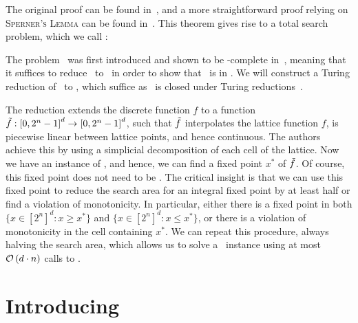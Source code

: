 The original proof can be found in~, and a more straightforward proof relying on \textsc{Sperner's Lemma} can be found in~. This theorem gives rise to a total search problem, which we call \Brouwer:


The problem \Brouwer\ was first introduced and shown to be \PPAD-complete in~, meaning that it suffices to reduce \Tarski\ to \Brouwer\ in order to show that \Tarski\ is in \PPAD\@. We will construct a Turing reduction of \Tarski\ to \Brouwer, which suffice as \PPAD\ is closed under Turing reductions~.

The reduction extends the discrete function $f$ to a function $\Tilde{f} : {[0, 2^n - 1]}^d \rightarrow {[0, 2^n - 1]}^d$, such that $\Tilde{f}$ interpolates the lattice function $f$, is piecewise linear between lattice points, and hence continuous. The authors achieve this by using a simplicial decomposition of each cell of the lattice. Now we have an instance of \Brouwer, and hence, we can find a fixed point $x^*$ of $\Tilde{f}$. Of course, this fixed point does not need to be .
The critical insight is that we can use this fixed point to reduce the search area for an integral fixed point by at least half or find a violation of monotonicity. In particular, either there is a fixed point in both $\{x \in {[2^n]}^d : x \geq x^*\}$ and $\{x \in {[2^n]}^d : x \leq x^*\}$, or there is a violation of monotonicity in the cell containing $x^*$.
We can repeat this procedure, always halving the search area, which allows us to solve a \Tarski\ instance using at most $\mathcal{O}\left(d \cdot n\right)$ calls to \Brouwer.

\section{Introducing \Tarskistar}\label{sec:introducing_tarskistar}

